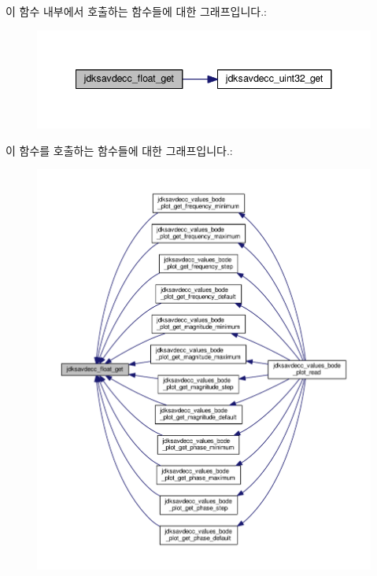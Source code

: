 이 함수 내부에서 호출하는 함수들에 대한 그래프입니다.\+:
\nopagebreak
\begin{figure}[H]
\begin{center}
\leavevmode
\includegraphics[width=341pt]{group__endian_gadf6108d4d5f2936dd5018e4b80265c8c_cgraph}
\end{center}
\end{figure}




이 함수를 호출하는 함수들에 대한 그래프입니다.\+:
\nopagebreak
\begin{figure}[H]
\begin{center}
\leavevmode
\includegraphics[width=350pt]{group__endian_gadf6108d4d5f2936dd5018e4b80265c8c_icgraph}
\end{center}
\end{figure}


